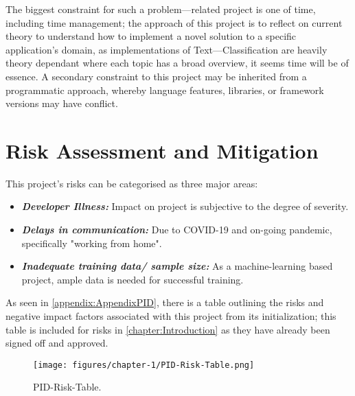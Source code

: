 The biggest constraint for such a problem---related project is one of time, including time management; the approach of this project is to reflect on current theory to understand how to implement a novel solution to a specific application’s domain, as implementations of Text---Classification are heavily theory dependant where each topic has a broad overview, it seems time will be of essence. A secondary constraint to this project may be inherited from a programmatic approach, whereby language features, libraries, or framework versions may have conflict.

\section{Risk Assessment and Mitigation}

This project's risks can be categorised as three major areas:

\begin{itemize}
	\item \textbf{\textit{Developer Illness:}} Impact on project is subjective to the degree of severity.
	\item \textbf{\textit{Delays in communication:}} Due to COVID-19 and on-going pandemic, specifically "working from home".
	\item \textbf{\textit{Inadequate training data/ sample size:}} As a machine-learning based project, ample data is needed for successful training.
\end{itemize}

As seen in \autoref{appendix:AppendixPID}, there is a table outlining the risks and negative impact factors associated with this project from its initialization; this table is included for risks in \autoref{chapter:Introduction} as they have already been signed off and approved.

\begin{figure}[H]
    \centering
    \texttt{[image: figures/chapter-1/PID-Risk-Table.png]}
    \caption[PID-Risk-Table]{PID-Risk-Table.
    \label{fig:PID-Risk-Table}}
\end{figure}